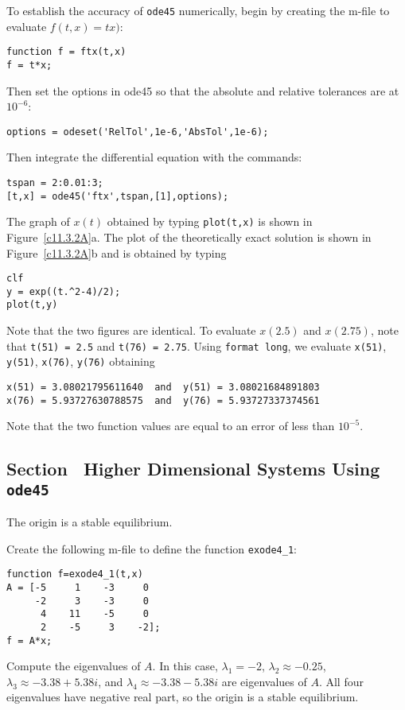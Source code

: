 To establish the accuracy of {\tt ode45} numerically, begin by creating the 
m-file to evaluate $f(t,x)=tx)$:
\begin{verbatim}
function f = ftx(t,x)
f = t*x;
\end{verbatim}
Then set the options in {\sf ode45} so that the absolute and relative
tolerances are at $10^{-6}$:
\begin{verbatim}
options = odeset('RelTol',1e-6,'AbsTol',1e-6);
\end{verbatim}
Then integrate the differential equation with the commands:
\begin{verbatim}
tspan = 2:0.01:3;
[t,x] = ode45('ftx',tspan,[1],options);
\end{verbatim}
The graph of $x(t)$ obtained by typing {\tt plot(t,x)} is shown in
Figure~\ref{c11.3.2A}a.  The plot of the theoretically exact solution
is shown in Figure~\ref{c11.3.2A}b and is obtained by typing
\begin{verbatim}
clf
y = exp((t.^2-4)/2);
plot(t,y)
\end{verbatim}
Note that the two figures are identical.  To evaluate $x(2.5)$ and $x(2.75)$,
note that {\tt t(51) = 2.5} and {\tt t(76) = 2.75}.  Using {\tt format long}, 
we evaluate {\tt x(51)}, {\tt y(51)}, {\tt x(76)}, {\tt y(76)} obtaining
\begin{verbatim}
x(51) = 3.08021795611640  and  y(51) = 3.08021684891803
x(76) = 5.93727630788575  and  y(76) = 5.93727337374561
\end{verbatim}
Note that the two function values are equal to an error of less than 
$10^{-5}$.

\begin{figure}[htb]
     \centerline{%
     }
\end{figure} 



\subsection*{Section~\protect{\ref{S:ode45HD}} Higher Dimensional Systems Using 
{\tt ode45}}

\ans The origin is a stable equilibrium.

\soln Create the following m-file to define the function {\tt exode4\_1}:
\begin{verbatim}
function f=exode4_1(t,x)
A = [-5     1    -3     0
     -2     3    -3     0
      4    11    -5     0
      2    -5     3    -2];
f = A*x;
\end{verbatim}
Compute the eigenvalues of $A$.  In this case, $\lambda_1 = -2$, $\lambda_2
\approx -0.25$, $\lambda_3 \approx -3.38 + 5.38i$, and $\lambda_4 \approx
-3.38 - 5.38i$ are eigenvalues of $A$.  All four eigenvalues have negative
real part, so the origin is a stable equilibrium.

